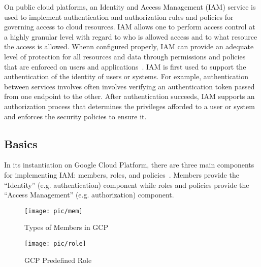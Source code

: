 On public cloud platforms, an Identity and Access Management (IAM) service is used to implement
authentication and authorization rules and policies for governing access to cloud resources.
IAM allows one to perform access control at a highly granular level with regard to who is allowed access and to what resource the access is allowed.
Whenn configured properly, IAM can provide an adequate level of protection for all resources and data through permissions and policies that are enforced on users and applications~\cite{AlmullaSameeraAbdulrahmanandYeun2010}.
IAM is first used to support the authentication of the identity of users or systems. For example, authentication between services involves often involves verifying an authentication token
passed from one endpoint to the other.  After authentication succeeds, IAM supports an
authorization process that determines the privileges afforded to a user or system and enforces
the security policies to ensure it.

\subsection{Basics}
In its instantiation on
Google Cloud Platform, there are three main components for implementing IAM: members, roles, and policies~\cite{Googlecloudiam}.  Members
provide the ``Identity'' (e.g. authentication) component while roles and policies provide the ``Access Management'' (e.g.
authorization) component.

\begin{figure}[h]
  \centering
  \texttt{[image: pic/mem]}
  \caption {Types of Members in GCP}
  \label{fig:mem}
\end{figure}

\begin{figure}[h]
    \centering
    \texttt{[image: pic/role]}
    \caption {GCP Predefined Role}
    \label{fig:role}
\end{figure}


